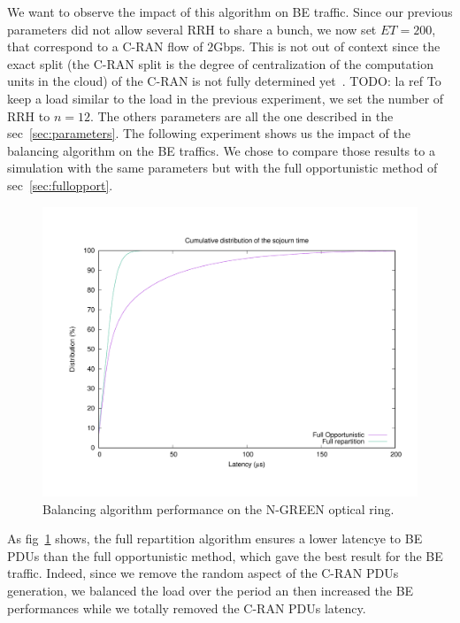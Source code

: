 \documentclass[]{algotel}
\newcommand{\todo}[1]{{\color{red} TODO: {#1}}}
\begin{document}
  We want to observe the impact of this algorithm on BE traffic. Since our previous parameters did not allow several RRH to share a bunch, we now set $ET = 200$, that correspond to a C-RAN flow of $2$Gbps. This is not out of context since the exact split (the C-RAN split is the degree of centralization of the computation units in the cloud) of the C-RAN is not fully determined yet~\cite{REF}.\todo {la ref} To keep a load similar to the load in the previous experiment, we set the number of RRH to $n=12$. The others parameters are all the one described in the sec~\ref{sec:parameters}.
  The following experiment shows us the impact of the balancing algorithm on the BE traffics. We chose to compare those results to a simulation with the same parameters but with the full opportunistic method of sec~\ref{sec:fullopport}.
  
   \begin{figure}[h]
\centering
      \includegraphics[scale=0.4]{optim.pdf}
     \caption{Balancing algorithm performance on the N-GREEN optical ring.}   \label{fig:optimres}
  \end{figure}
  
  As fig~\ref{fig:optimres} shows, the full repartition algorithm ensures a lower latencye to BE PDUs than the full opportunistic method, which gave the best result for the BE traffic. Indeed, since we remove the random aspect of the C-RAN PDUs generation, we balanced the load over the period an then increased the BE performances while we totally removed the C-RAN PDUs latency.
  
  

\end{document}
